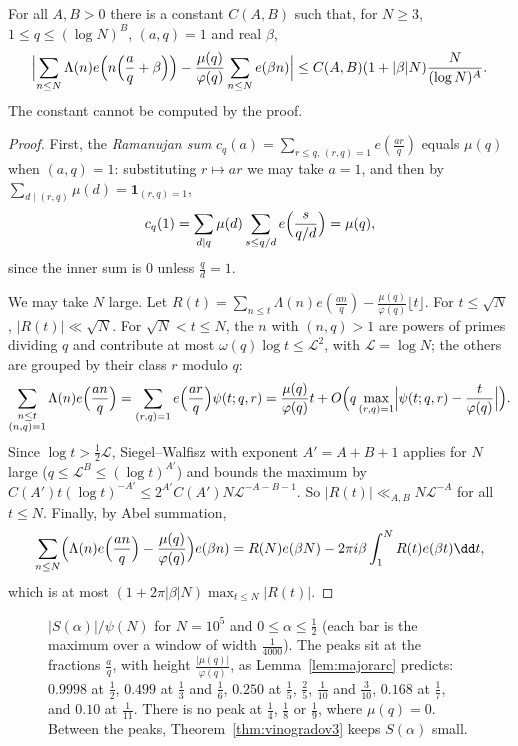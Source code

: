 \begin{lemma}\label{lem:majorarc}
For all $A,B>0$ there is a constant $C(A,B)$ such that, for $N\ge3$, $1\le q\le(\log N)^B$, $(a,q)=1$ and real $\beta$,
\[
\Bigl|\sum_{n\le N}\Lambda(n)e\Bigl(n\Bigl(\frac aq+\beta\Bigr)\Bigr)-\frac{\mu(q)}{\varphi(q)}\sum_{n\le N}e(\beta n)\Bigr|\le C(A,B)(1+|\beta|N)\frac N{(\log N)^A}.
\]
The constant cannot be computed by the proof.
\end{lemma}
\begin{proof}
First, the \emph{Ramanujan sum} $c_q(a)=\sum_{r\le q,\,(r,q)=1}e(\frac{ar}q)$ equals $\mu(q)$ when $(a,q)=1$: substituting $r\mapsto ar$ we may take $a=1$, and then by $\sum_{d\mid(r,q)}\mu(d)=\mathbf 1_{(r,q)=1}$,
\[
c_q(1)=\sum_{d\mid q}\mu(d)\sum_{s\le q/d}e\Bigl(\frac s{q/d}\Bigr)=\mu(q),
\]
since the inner sum is $0$ unless $\frac qd=1$.

We may take $N$ large. Let $R(t)=\sum_{n\le t}\Lambda(n)e(\frac{an}q)-\frac{\mu(q)}{\varphi(q)}\lfloor t\rfloor$. For $t\le\sqrt N$, $|R(t)|\ll\sqrt N$. For $\sqrt N<t\le N$, the $n$ with $(n,q)>1$ are powers of primes dividing $q$ and contribute at most $\omega(q)\log t\le\mathcal L^2$, with $\mathcal L=\log N$; the others are grouped by their class $r$ modulo $q$:
\[
\sum_{\substack{n\le t\\(n,q)=1}}\Lambda(n)e\Bigl(\frac{an}q\Bigr)=\sum_{(r,q)=1}e\Bigl(\frac{ar}q\Bigr)\psi(t;q,r)=\frac{\mu(q)}{\varphi(q)}t+O\Bigl(q\max_{(r,q)=1}\Bigl|\psi(t;q,r)-\frac t{\varphi(q)}\Bigr|\Bigr).
\]
Since $\log t>\frac12\mathcal L$, Siegel--Walfisz with exponent $A'=A+B+1$ applies for $N$ large ($q\le\mathcal L^B\le(\log t)^{A'}$) and bounds the maximum by $C(A')t(\log t)^{-A'}\le2^{A'}C(A')N\mathcal L^{-A-B-1}$. So $|R(t)|\ll_{A,B}N\mathcal L^{-A}$ for all $t\le N$. Finally, by Abel summation,
\[
\sum_{n\le N}\Bigl(\Lambda(n)e\Bigl(\frac{an}q\Bigr)-\frac{\mu(q)}{\varphi(q)}\Bigr)e(\beta n)=R(N)e(\beta N)-2\pi i\beta\int_1^NR(t)e(\beta t)\dd t,
\]
which is at most $(1+2\pi|\beta|N)\max_{t\le N}|R(t)|$.
\end{proof}

\begin{figure}[ht]
\centering
{}
\caption{$|S(\alpha)|/\psi(N)$ for $N=10^5$ and $0\le\alpha\le\frac12$ (each bar is the maximum over a window of width $\frac1{4000}$). The peaks sit at the fractions $\frac aq$, with height $\frac{|\mu(q)|}{\varphi(q)}$, as Lemma~\ref{lem:majorarc} predicts: $0.9998$ at $\frac12$, $0.499$ at $\frac13$ and $\frac16$, $0.250$ at $\frac15$, $\frac25$, $\frac1{10}$ and $\frac3{10}$, $0.168$ at $\frac17$, and $0.10$ at $\frac1{11}$. There is no peak at $\frac14$, $\frac18$ or $\frac19$, where $\mu(q)=0$. Between the peaks, Theorem~\ref{thm:vinogradov3} keeps $S(\alpha)$ small.}
\label{fig:primesum}
\end{figure}

